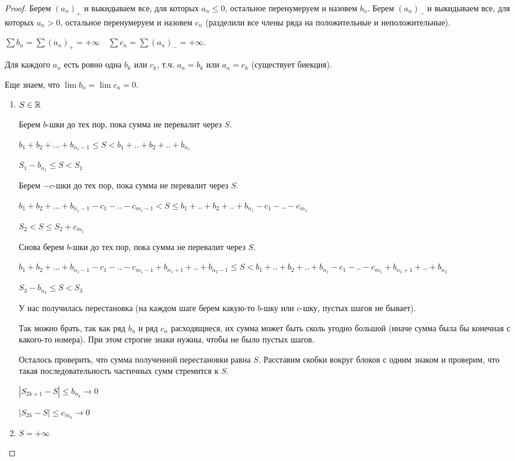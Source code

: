 \begin{proof}
    Берем $(a_n)_+$ и выкидываем все, для которых $a_n\leq 0$, остальное перенумеруем и назовем $b_n$. Берем $(a_n)_-$ и выкидываем все, для которых $a_n>0$, остальное перенумеруем и назовем $c_n$ (разделили все члены ряда на положительные и неположительные).

    $\sum b_n=\sum (a_n)_+=+\infty\quad\sum c_n=\sum (a_n)_-=+\infty$.

    Для каждого $a_n$ есть ровно одна $b_k$ или $c_k$, т.ч. $a_n=b_k$ или $a_n=c_k$ (существует биекция).

    Еще знаем, что $\lim b_n=\lim c_n=0$.

    \begin{enumerate}
        \item $S\in \mathbb{R}$

        Берем $b$-шки до тех пор, пока сумма не перевалит через $S$.

        $b_1+b_2+...+b_{n_1-1}\leq S< b_1+..+b_2+..+b_{n_1}$

        $S_1-b_{n_1} \leq S < S_1$

        Берем $-c$-шки до тех пор, пока сумма не перевалит через $S$.

        $b_1+b_2+...+b_{n_1-1}-c_1-..-c_{m_1-1}< S\leq  b_1+..+b_2+..+b_{n_1}-c_1-..-c_{m_1}$

        $S_2 < S \leq S_2 + c_{m_1}$

        Снова берем $b$-шки до тех пор, пока сумма не перевалит через $S$.

        $b_1+b_2+...+b_{n_1-1}-c_1-..-c_{m_1-1}+b_{n_1+1}+..+b_{n_2-1}\leq S <  b_1+..+b_2+..+b_{n_1}-c_1-..-c_{m_1}+b_{n_1+1}+..+b_{n_2}$

        $S_3-b_{n_2} \leq S < S_3$

        У нас получилась перестановка (на каждом шаге берем какую-то $b$-шку или $c$-шку, пустых шагов не бывает).
        
        Так можно брать, так как ряд $b_n$ и ряд $c_n$ расходящиеся, их сумма может быть сколь угодно большой (иначе сумма была бы конечная с какого-то номера). При этом строгие знаки нужны, чтобы не было пустых шагов.

        Осталось проверить, что сумма полученной перестановки равна $S$. Расставим скобки вокруг блоков с одним знаком и проверим, что такая последовательность частичных сумм стремится к $S$.

        $|S_{2k+1}-S|\leq b_{n_k}\rightarrow 0$

        $|S_{2k}-S|\leq c_{m_k}\rightarrow 0$
        \item $S=+\infty$


\end{enumerate}
\end{proof}
